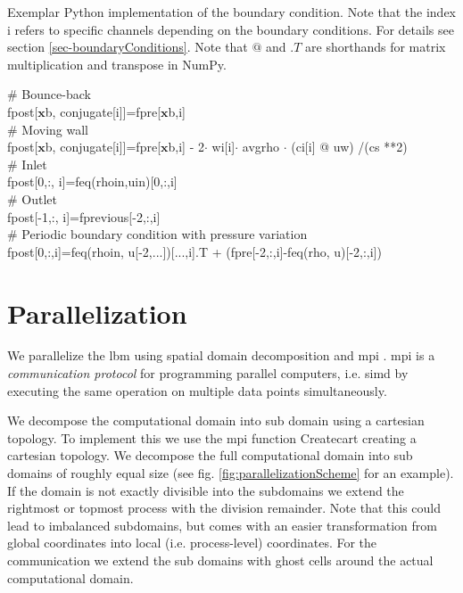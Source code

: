 \documentclass[a4paper,11pt, footsepline]{book}
\begin{document}
\begin{algorithm}
 \caption{\label{algo-boundaryConditions}Exemplar Python implementation of the boundary condition. Note that the index i refers to specific channels depending on the boundary conditions. For details see section \ref{sec-boundaryConditions}. Note that $@$ and $.T$ are shorthands for matrix multiplication and transpose in NumPy.}
     \SetAlgoLined
     \# Bounce-back\\
     f\textunderscore post[$\mathbf{x}$\textunderscore b, conjugate[i]]=f\textunderscore pre[$\mathbf{x}$\textunderscore b,i] \\
     \# Moving wall\\
          f\textunderscore post[$\mathbf{x}$\textunderscore b, conjugate[i]]=f\textunderscore pre[$\mathbf{x}$\textunderscore b,i] - 2$\cdot$ w\textunderscore i[i]$\cdot$ avg\textunderscore rho $\cdot$ (c\textunderscore i[i] @ u\textunderscore w) /(c\textunderscore s **2) \\
          \# Inlet\\
     f\textunderscore post[0,:, i]=f\textunderscore eq(rho\textunderscore in,u\textunderscore in)[0,:,i]\\
     \# Outlet\\
     f\textunderscore post[-1,:, i]=f\textunderscore previous[-2,:,i]\\
     \# Periodic boundary condition with pressure variation\\
  f\textunderscore post[0,:,i]=f\textunderscore eq(rho\textunderscore in, u[-2,...])[...,i].T + (f\textunderscore pre[-2,:,i]-f\textunderscore eq(rho, u)[-2,:,i])
\end{algorithm}
\section{Parallelization}\label{sec-parallelization}
We parallelize the \ac{lbm} using spatial domain decomposition and \acf{mpi} \cite{Dalcin.2005, Dalcin.2008, Dalcin.2011}. \ac{mpi} is a \textit{communication protocol} for programming parallel computers, i.e. \ac{simd} \cite{Flynn.1972} by executing the same operation on multiple data points simultaneously.

We decompose the computational domain into sub domain using a cartesian topology. To implement this we use the \ac{mpi} function \textsf{Create\textunderscore cart} creating a cartesian topology.
We decompose the full computational domain into sub domains of roughly equal size (see fig. \ref{fig:parallelizationScheme} for an example).
If the domain is not exactly divisible into the subdomains we extend the rightmost or topmost process with the division remainder. Note that this could lead to imbalanced subdomains, but comes with an easier transformation from global coordinates into local (i.e. process-level) coordinates. For the communication we extend the sub domains with ghost cells around the actual computational domain.
\end{document}
